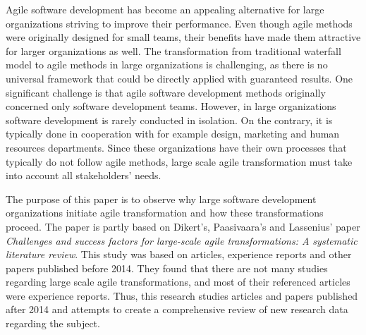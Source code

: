 Agile software development has become an appealing alternative for
large organizations striving to improve their performance. Even
though agile methods were originally designed for small teams, their
benefits have made them attractive for larger organizations as well.
The transformation from traditional waterfall model to agile methods
in large organizations is challenging, as there is no universal
framework that could be directly applied with guaranteed results.
One significant challenge is that agile software development methods
originally concerned only software development teams. However, in
large organizations software development is rarely conducted in
isolation. On the contrary, it is typically done in cooperation with for
example design, marketing and human resources departments. Since these
organizations have their own processes that typically do not follow
agile methods, large scale agile transformation must take into account
all stakeholders' needs.

The purpose of this paper is to observe why large software development
organizations initiate agile transformation and how these transformations
proceed. The paper is partly based on Dikert's, Paasivaara's and Lassenius'
paper \textit{Challenges and success factors for large-scale agile
transformations: A systematic literature review}. This study was based on
articles, experience reports and other papers published before 2014. They found
that there are not many studies regarding large scale agile transformations,
and most of their referenced articles were experience reports. Thus, this
research studies articles and papers published after 2014 and attempts to
create a comprehensive review of new research data regarding the subject.
